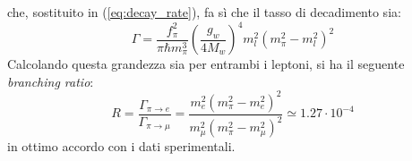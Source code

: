 \documentclass{subnucbo}
\begin{document}
che, sostituito in (\ref{eq:decay_rate}), fa sì che il tasso di decadimento sia:
\begin{equation}
        \Gamma = \frac { f _ { \pi } ^ { 2 } } { \pi \hbar m _ { \pi } ^ { 3 } } \left( \frac { g _ { w } } { 4 M _ { w } } \right) ^ { 4 } m _ { l } ^ { 2 } \left( m _ { \pi } ^ { 2 } - m _ { l } ^ { 2 } \right) ^ { 2 }
        \label{eq:decay_rate_pion}
\end{equation}
Calcolando questa grandezza sia per entrambi i leptoni, si ha il seguente \textit{branching ratio}:
\begin{equation}
        R = \frac { \Gamma _ { \pi \rightarrow e } } { \Gamma _ { \pi \rightarrow \mu } } = \frac { m _ { e } ^ { 2 } \left( m_{\pi}^{2} - m_{e}^2  \right) ^ { 2 } } { m _ { \mu } ^ { 2 } \left( m_{\pi}^2 - m_{\mu}^2 \right) ^ { 2 } } \simeq  1.27 \cdot 10 ^ { - 4 }
        \label{eq:br_ratio}
\end{equation}
in ottimo accordo con i dati sperimentali.
\end{document}
